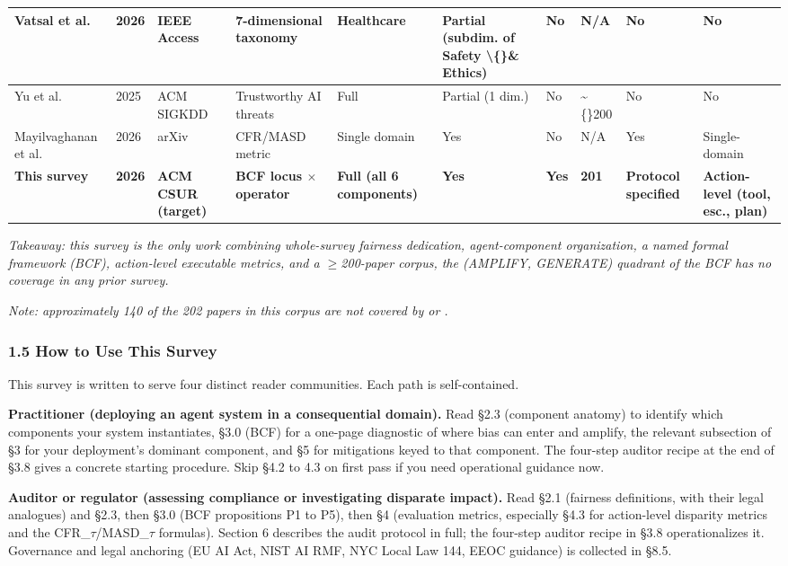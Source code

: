 \documentclass[10pt]{article}
\begin{document}
\begin{center}
\begin{longtable}{|p{}|p{}|p{}|p{}|p{}|p{}|p{}|p{}|p{}|p{}|}
Vatsal et al. \cite{vatsal2026agentic} & 2026 & IEEE Access & 7-dimensional taxonomy & Healthcare & Partial (subdim. of Safety \textbackslash\{\}\& Ethics) & No & N/A & No & No \\ \hline
Yu et al. \cite{yu2025survey} & 2025 & ACM SIGKDD & Trustworthy AI threats & Full & Partial (1 dim.) & No & \textasciitilde\{\}200 & No & No \\ \hline
Mayilvaghanan et al. \cite{mayilvaghanan2026counterfactual} & 2026 & arXiv & CFR/MASD metric & Single domain & Yes & No & N/A & Yes & Single-domain \\ \hline
\textbf{This survey} & \textbf{2026} & \textbf{ACM CSUR (target)} & \textbf{BCF locus $\times$ operator} & \textbf{Full (all 6 components)} & \textbf{Yes} & \textbf{Yes} & \textbf{201} & \textbf{Protocol specified} & \textbf{Action-level (tool, esc., plan)} \\ \hline
\end{longtable}\end{center}

\emph{Takeaway: this survey is the only work combining whole-survey fairness dedication, agent-component organization, a named formal framework (BCF), action-level executable metrics, and a $\geq$200-paper corpus, the (AMPLIFY, GENERATE) quadrant of the BCF has no coverage in any prior survey.}

\emph{Note: approximately 140 of the 202 papers in this corpus are not covered by \cite{gallegos2024bias} or \cite{chu2024fairness}.}


\subsubsection*{1.5 How to Use This Survey}

This survey is written to serve four distinct reader communities. Each path is self-contained.

\textbf{Practitioner (deploying an agent system in a consequential domain).} Read \S{}2.3 (component anatomy) to identify which components your system instantiates, \S{}3.0 (BCF) for a one-page diagnostic of where bias can enter and amplify, the relevant subsection of \S{}3 for your deployment's dominant component, and \S{}5 for mitigations keyed to that component. The four-step auditor recipe at the end of \S{}3.8 gives a concrete starting procedure. Skip \S{}4.2 to 4.3 on first pass if you need operational guidance now.

\textbf{Auditor or regulator (assessing compliance or investigating disparate impact).} Read \S{}2.1 (fairness definitions, with their legal analogues) and \S{}2.3, then \S{}3.0 (BCF propositions P1 to P5), then \S{}4 (evaluation metrics, especially \S{}4.3 for action-level disparity metrics and the CFR\_$\tau$/MASD\_$\tau$ formulas). Section 6 describes the audit protocol in full; the four-step auditor recipe in \S{}3.8 operationalizes it. Governance and legal anchoring (EU AI Act, NIST AI RMF, NYC Local Law 144, EEOC guidance) is collected in \S{}8.5.
\end{document}
